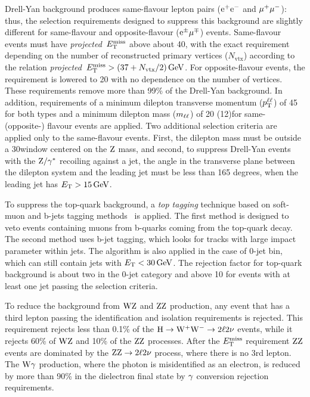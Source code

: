 \documentclass[12pt,twoside,a4paper,cmspaper,final,collab]{cms-tdr}
\begin{document}
Drell-Yan background produces same-flavour lepton pairs ($\mathrm{e}^+\mathrm{e}^-$ and ${\mu^+}{\mu^-}$):
thus, the selection requirements designed to suppress this background are slightly
different for same-flavour and opposite-flavour ($\mathrm{e}^{\pm}{\mu}^{\mp}$) events.
Same-flavour events must have \textit{projected}~$E_{\mathrm{T}}^{\text{miss}}$ above about 40\GeV,
with the exact requirement depending on the number of reconstructed primary vertices ($N_\text{vtx}$)
according to the relation \textit{projected}~$E_{\mathrm{T}}^{\text{miss}} >( 37 +N_\text{vtx}/ 2 )\,\text{Ge\hspace{-.08em}V}$.
For opposite-flavour events, the requirement is lowered to 20\GeV
with no dependence on the number of vertices.
These requirements remove more than 99\% of the Drell-Yan background.
In addition, requirements of a minimum dilepton transverse momentum ($p_{\mathrm{T}}^{\ell\ell}$)
of 45\GeV
for both types and a minimum dilepton mass ($m_{\mathrm{\ell}\mathrm{\ell}}$) of 20 (12)\GeV for same-
(opposite-) flavour events are applied.
Two additional selection criteria are applied only to the same-flavour events.
First, the dilepton mass must be outside a 30\GeV window centered on the $\mathrm{Z}$ mass,
and second, to suppress Drell-Yan events with the $\mathrm{Z}/\gamma^*$ recoiling against a jet, the angle
in the transverse plane between the dilepton system and the leading jet must be less
than 165 degrees, when the leading jet has $E_{\mathrm{T}}>15\,\text{Ge\hspace{-.08em}V}$.

To suppress the top-quark background, a \textit{top tagging} technique based
on soft-muon and b-jets tagging methods~\cite{btag1,btag2} is applied. The first
method is designed to veto events containing muons from b-quarks coming from the top-quark decay. The second
method uses b-jet tagging, which looks for tracks with large
impact parameter within jets. The algorithm is also applied in the
case of 0-jet bin, which can still contain jets with $E_{\mathrm{T}} <30\,\text{Ge\hspace{-.08em}V}$.
The rejection factor for top-quark background is about two in the 0-jet
category and above 10 for events with at least one jet passing the selection criteria.

To reduce the background from $\mathrm{W}\mathrm{Z}$ and $\mathrm{Z}\mathrm{Z}$ production, any event
that has a third lepton passing the identification and isolation requirements is rejected.
This requirement rejects less than 0.1\% of the $\mathrm{H}\to\mathrm{W^+}{}\mathrm{W^-} \to 2\ell2\nu$ events, while
it rejects 60\% of $\mathrm{W}\mathrm{Z}$ and 10\% of the $\mathrm{Z}\mathrm{Z}$ processes. After the $E_{\mathrm{T}}^{\text{miss}}$ requirement
$\mathrm{Z}\mathrm{Z}$ events are dominated by the $\mathrm{Z}\mathrm{Z} \to 2\ell 2\nu$ process,
where there is no 3rd lepton. The $\mathrm{W}\gamma$ production,
where the photon is misidentified as an electron, is reduced by more than 90\%
in the dielectron final state by $\gamma$ conversion rejection requirements.
\end{document}
